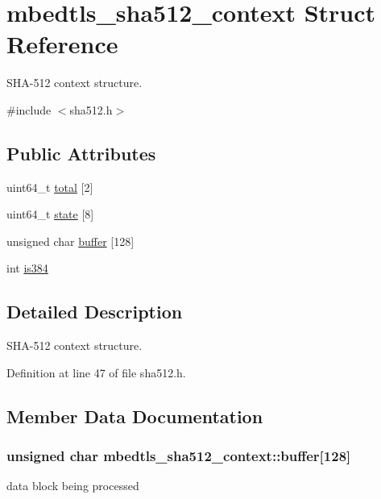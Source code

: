 \hypertarget{structmbedtls__sha512__context}{\section{mbedtls\-\_\-sha512\-\_\-context Struct Reference}
\label{structmbedtls__sha512__context}
}


S\-H\-A-\/512 context structure.  




{\ttfamily \#include $<$sha512.\-h$>$}

\subsection*{Public Attributes}
\begin{DoxyCompactItemize}
\item 
uint64\-\_\-t \hyperlink{structmbedtls__sha512__context_a0c0c3f28093d6107c549d235bcd50726}{total} \mbox{[}2\mbox{]}
\item 
uint64\-\_\-t \hyperlink{structmbedtls__sha512__context_a9c7c627cf1904c576244eaca0c5d7928}{state} \mbox{[}8\mbox{]}
\item 
unsigned char \hyperlink{structmbedtls__sha512__context_a81d3accbf0fd1c5d5e1dfbabca0b15f8}{buffer} \mbox{[}128\mbox{]}
\item 
int \hyperlink{structmbedtls__sha512__context_a5061492d17d1a77471e61b0353db4e58}{is384}
\end{DoxyCompactItemize}


\subsection{Detailed Description}
S\-H\-A-\/512 context structure. 

Definition at line 47 of file sha512.\-h.



\subsection{Member Data Documentation}
\hypertarget{structmbedtls__sha512__context_a81d3accbf0fd1c5d5e1dfbabca0b15f8}{
\subsubsection[{buffer}]{\setlength{\rightskip}{0pt plus 5cm}unsigned char mbedtls\-\_\-sha512\-\_\-context\-::buffer\mbox{[}128\mbox{]}}}\label{structmbedtls__sha512__context_a81d3accbf0fd1c5d5e1dfbabca0b15f8}
data block being processed 


